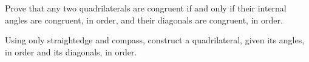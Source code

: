 Prove that any two quadrilaterals are congruent if and only if
their internal angles are congruent, in order,
and their diagonals are congruent, in order.

Using only straightedge and compass,
construct a quadrilateral,
given its angles, in order
and its diagonals, in order.
